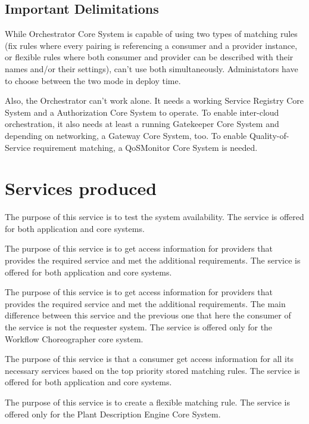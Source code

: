\documentclass[a4paper]{arrowhead}
\begin{document}
\subsection{Important Delimitations}
\label{sec:delimitations}

While Orchestrator Core System is capable of using two types of matching rules (fix rules where every pairing is referencing a consumer and a provider instance, or flexible rules where both consumer and provider can be described with their names and/or their settings), can't use both simultaneously. Administators have to choose between the two mode in deploy time.

Also, the Orchestrator can't work alone. It needs a working Service Registry Core System and a Authorization Core System to operate. To enable inter-cloud orchestration, it also needs at least a running Gatekeeper Core System and depending on networking, a Gateway Core System, too. To enable Quality-of-Service requirement matching, a QoSMonitor Core System is needed.

\newpage

\section{Services produced}
\label{sec:services}

The purpose of this service is to test the system availability. The service is offered for both application and core systems. 

The purpose of this service is to get access information for providers that provides the required service and met the additional requirements. The service is offered for both application and core systems. 

The purpose of this service is to get access information for providers that provides the required service and met the additional requirements. The main difference between this service and the previous one that here the consumer of the service is not the requester system. The service is offered only for the Workflow Choreographer core system. 

The purpose of this service is that a consumer get access information for all its necessary services based on the top priority stored matching rules. The service is offered for both application and core systems.

The purpose of this service is to create a flexible matching rule. The service is offered only for the Plant Description Engine Core System.
\end{document}
